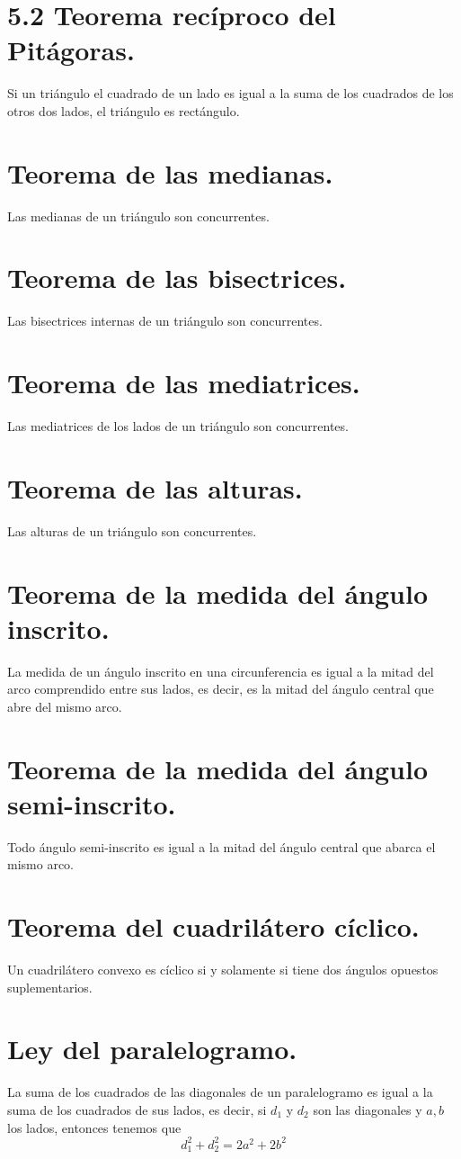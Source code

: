 \documentclass[12pt,a4paper]{book}
\begin{document}
\section{5.2 Teorema recíproco del Pitágoras.}
Si un triángulo el cuadrado de un lado es igual a la suma de los cuadrados de los otros dos lados, el triángulo es rectángulo.
\section{Teorema de las medianas.}
Las medianas de un triángulo son concurrentes.
\section{Teorema de las bisectrices.}
Las bisectrices internas de un triángulo son concurrentes.
\section{Teorema de las mediatrices.}
Las mediatrices de los lados de un triángulo son concurrentes.
\section{Teorema de las alturas.}
Las alturas de un triángulo son concurrentes.
\section{Teorema de la medida del ángulo inscrito.}
La medida de un ángulo inscrito en una circunferencia es igual a la mitad del arco comprendido entre sus lados, es decir, es la mitad del ángulo central que abre del mismo arco.
\section{Teorema de la medida del ángulo semi-inscrito.}
Todo ángulo semi-inscrito es igual a la mitad del ángulo central que abarca el mismo arco.
\section{Teorema del cuadrilátero cíclico.}
Un cuadrilátero convexo es cíclico si y solamente si tiene dos ángulos opuestos suplementarios.
\section{Ley del paralelogramo.}
La suma de los cuadrados de las diagonales de un paralelogramo es igual a la suma de los cuadrados de sus lados, es decir, si $d_1$ y $d_2$ son las diagonales y $a, b$ los lados, entonces tenemos que 
$$d_1^2 + d_2^2=2a^2+2b^2$$
\end{document}
